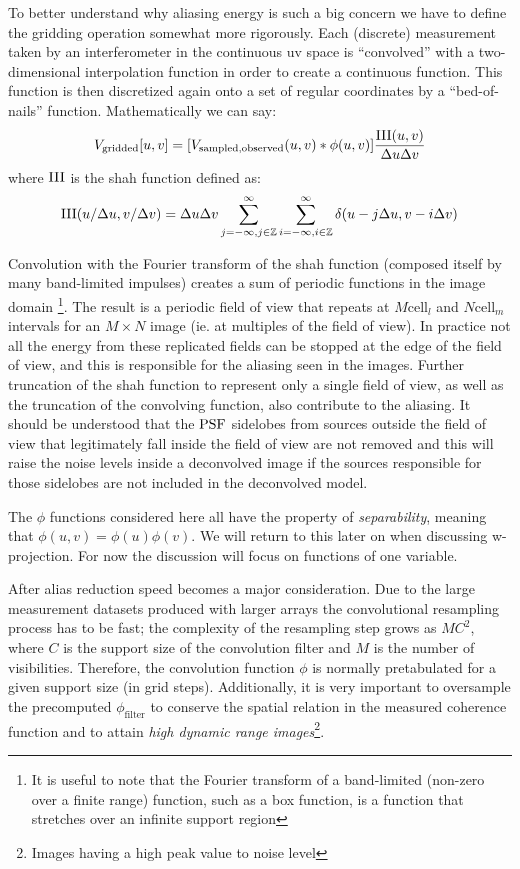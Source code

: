  To better understand why aliasing energy is such a big concern we have to define the gridding operation somewhat more 
 rigorously. Each (discrete) measurement taken by an interferometer in the continuous uv space  is ``convolved'' with a two-dimensional interpolation 
 function in order to create a continuous function. This function is then discretized again onto a set of regular coordinates by a 
 ``bed-of-nails'' function. Mathematically we can say:
 \begin{equation}
  V_{\text{gridded}}[u,v] = [V_{\text{sampled,observed}}(u,v)*\phi(u,v)]\frac{\textrm{III}(u,v)}{\Delta{u}\Delta{v}}
 \end{equation}
 where $\textrm{III}$ is the shah function defined as:
 \begin{equation}
  \textrm{III}(u/\Delta{u},v/\Delta{v})=\Delta{u}\Delta{v}\sum_{j=-\infty,j\in\mathbb{Z}}^{\infty}{\sum_{i=-\infty,i\in\mathbb{Z}}^{\infty}{\delta{(u-j\Delta{u},v-i\Delta{v})}}}
 \end{equation}
 
 Convolution with the Fourier transform of the shah function (composed itself by many band-limited impulses) creates a sum of periodic functions
 in the image domain \footnote{It is useful to note that the Fourier transform of a band-limited (non-zero over a finite range) function, 
 such as a box function, is a function that stretches over an infinite support region}. The result is a periodic field of view that repeats at
 $M\text{cell}_l$ and $N\text{cell}_m$ intervals for an $M\times N$ image (ie. at multiples of the field of view). In practice not all the energy from 
 these replicated fields can be stopped at the edge of the field of view, and this is responsible for the aliasing seen in the images. Further
 truncation of the shah function to represent only a single field of view, as well as the truncation of the convolving function, also 
 contribute to the aliasing. It should be understood that the $\textrm{PSF}$ sidelobes from sources outside the field of view that legitimately fall inside
 the field of view are not removed and this will raise the noise levels inside a deconvolved image if the sources responsible for those sidelobes are not
 included in the deconvolved model.
 
 The $\phi$ functions considered here all have the property of \emph{separability}, meaning that $\phi(u,v) = \phi(u)\phi(v)$. We will return
 to this later on when discussing w-projection. For now the discussion will focus on functions of one variable.
 
 After alias reduction speed becomes a major consideration. Due to the large measurement datasets produced with larger arrays the convolutional resampling process
 has to be fast; the complexity of the resampling step grows as $MC^2$, where $C$ is the support size of the convolution filter and $M$ is the number of visibilities. 
 Therefore, the convolution function $\phi$ is normally pretabulated for a given support size (in grid steps). Additionally, it is very important to oversample
 the precomputed $\phi_{\text{filter}}$ to conserve the spatial relation in the measured coherence function and to attain 
 \emph{high dynamic range images}\footnote{Images having a high peak value to noise level}.
 
